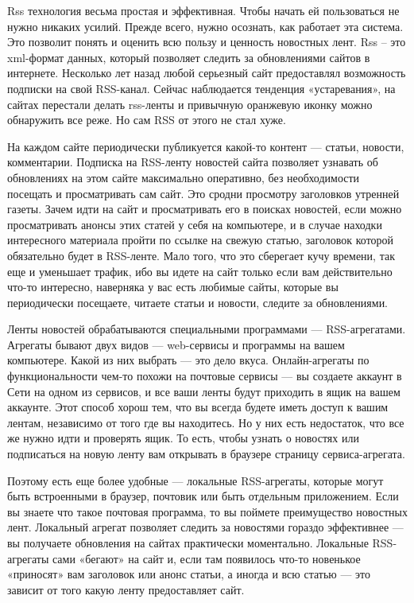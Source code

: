 \documentclass[14pt,a4paper]{extreport}
\begin{document}
	\flushleft\hspace{4ex} Rss технология весьма простая и эффективная. Чтобы начать ей пользоваться не нужно никаких усилий. Прежде всего, нужно осознать, как работает эта система. Это позволит понять и оценить всю пользу и ценность новостных лент.
Rss – это xml-формат данных, который позволяет следить за обновлениями сайтов в интернете. Несколько лет назад любой серьезный сайт предоставлял возможность подписки на свой RSS-канал. Сейчас наблюдается тенденция «устаревания», на сайтах перестали делать rss-ленты и привычную оранжевую иконку можно обнаружить все реже.   Но сам RSS от этого не стал хуже.\par

\hspace{4ex}На каждом сайте периодически публикуется какой-то контент — статьи, новости, комментарии. Подписка на RSS-ленту новостей сайта позволяет узнавать об обновлениях на этом сайте максимально оперативно, без необходимости посещать и просматривать сам сайт. Это сродни просмотру заголовков утренней газеты. Зачем идти на сайт и просматривать его в поисках новостей, если можно просматривать анонсы этих статей у себя на компьютере, и в случае находки интересного материала пройти по ссылке на свежую статью, заголовок которой обязательно будет в RSS-ленте.  Мало того, что это сберегает кучу времени, так еще и уменьшает трафик, ибо вы идете на сайт только если вам действительно что-то интересно, наверняка у вас есть любимые сайты, которые вы периодически посещаете, читаете статьи и новости, следите за обновлениями.

\hspace{4ex}Ленты новостей обрабатываются специальными программами — RSS-агрегатами.  Агрегаты бывают двух видов — web-сервисы и программы на вашем компьютере. Какой из них выбрать — это дело вкуса. Онлайн-агрегаты по функциональности чем-то похожи на почтовые сервисы — вы создаете аккаунт в Сети на одном из сервисов, и все ваши ленты будут приходить в ящик на вашем аккаунте. Этот способ хорош тем, что вы всегда будете иметь доступ к вашим лентам, независимо от того где вы находитесь. Но у них есть недостаток, что все же нужно идти и проверять ящик. То есть, чтобы узнать о новостях или подписаться на новую ленту вам открывать в браузере страницу сервиса-агрегата.

\hspace{4ex}Поэтому есть еще более удобные — локальные RSS-агрегаты, которые могут быть встроенными в браузер, почтовик или быть отдельным приложением.  Если вы знаете что такое почтовая программа, то вы поймете преимущество новостных лент. Локальный агрегат позволяет следить за новостями гораздо эффективнее — вы получаете обновления на сайтах практически моментально. Локальные RSS-агрегаты сами «бегают» на сайт и, если там появилось что-то новенькое «приносят» вам заголовок или анонс статьи, а иногда и всю статью — это зависит от того какую ленту предоставляет сайт.
\end{document}

